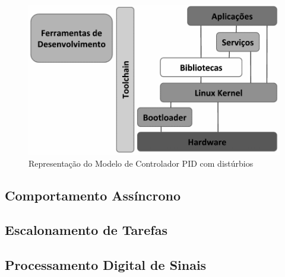 \begin{figure}[!ht]
  \caption{Representação do Modelo de Controlador PID com distúrbios}
  \begin{center}
      \includegraphics[scale=0.35]{img/sistema-linux-overview_embarcados}
  \end{center}
  \label{fig:sistema-linux-overview_embarcados}
\end{figure}


\subsection{Comportamento Assíncrono}

\subsection{Escalonamento de Tarefas}

\subsection{Processamento Digital de Sinais}

